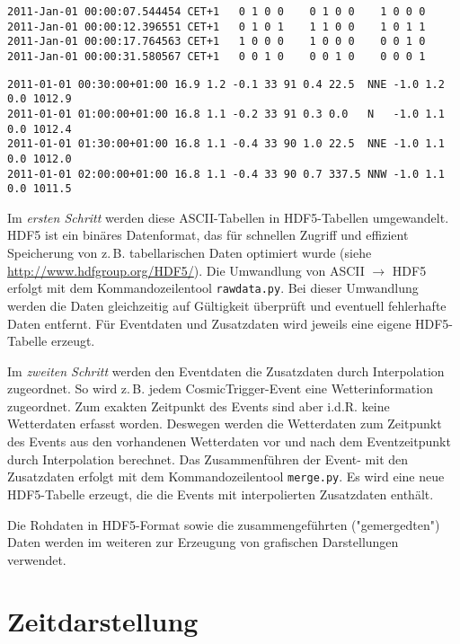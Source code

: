 \documentclass[version=last,
	a4paper,			%
	pagesize, 			%
	11pt,				%
	BCOR1cm,			%
	DIV12,	 			%
	pointlessnumbers,   %
	halfparskip,		%
]{scrreprt}
\newcommand{\zb}{z.\,B.\xspace}
\begin{document}
\begin{lstlisting}[label=lst:ctascii,caption={Beispiel von CosmicTrigger-Rohdaten}]
2011-Jan-01 00:00:07.544454 CET+1   0 1 0 0    0 1 0 0    1 0 0 0
2011-Jan-01 00:00:12.396551 CET+1   0 1 0 1    1 1 0 0    1 0 1 1
2011-Jan-01 00:00:17.764563 CET+1   1 0 0 0    1 0 0 0    0 0 1 0
2011-Jan-01 00:00:31.580567 CET+1   0 0 1 0    0 0 1 0    0 0 0 1
\end{lstlisting}

\begin{lstlisting}[label=lst:zweather,caption={Beispiel von Zeuthen-Wetter-Rohdaten},	
                   xleftmargin=-1.5em,xrightmargin=-1.5em]
2011-01-01 00:30:00+01:00 16.9 1.2 -0.1 33 91 0.4 22.5  NNE -1.0 1.2 0.0 1012.9
2011-01-01 01:00:00+01:00 16.8 1.1 -0.2 33 91 0.3 0.0   N   -1.0 1.1 0.0 1012.4
2011-01-01 01:30:00+01:00 16.8 1.1 -0.4 33 90 1.0 22.5  NNE -1.0 1.1 0.0 1012.0
2011-01-01 02:00:00+01:00 16.8 1.1 -0.4 33 90 0.7 337.5 NNW -1.0 1.1 0.0 1011.5
\end{lstlisting}

Im \emph{ersten Schritt} werden diese ASCII-Tabellen in  HDF5-Tabellen umgewandelt. HDF5 ist ein binäres Datenformat, das für schnellen Zugriff und effizient Speicherung von \zb tabellarischen Daten optimiert wurde (siehe \url{http://www.hdfgroup.org/HDF5/}). Die Umwandlung von ASCII $\rightarrow$ HDF5 erfolgt mit dem Kommandozeilentool \texttt{rawdata.py}. Bei dieser Umwandlung werden die Daten gleichzeitig auf Gültigkeit überprüft und eventuell fehlerhafte Daten entfernt. Für Eventdaten und Zusatzdaten wird jeweils eine eigene HDF5-Tabelle erzeugt.

Im \emph{zweiten Schritt} werden den Eventdaten die Zusatzdaten durch Interpolation zugeordnet. So wird \zb jedem CosmicTrigger-Event eine Wetterinformation zugeordnet. Zum exakten Zeitpunkt des Events sind aber i.d.R. keine Wetterdaten erfasst worden. Deswegen werden die Wetterdaten zum Zeitpunkt des Events aus den vorhandenen Wetterdaten vor und nach dem Eventzeitpunkt durch Interpolation berechnet. Das Zusammenführen der Event- mit den Zusatzdaten erfolgt mit dem Kommandozeilentool \texttt{merge.py}. Es wird eine neue HDF5-Tabelle erzeugt, die die Events mit interpolierten Zusatzdaten enthält.

Die Rohdaten in HDF5-Format sowie die zusammengeführten ("gemergedten") Daten werden im weiteren zur Erzeugung von grafischen Darstellungen verwendet.

\section{Zeitdarstellung}
\end{document}

